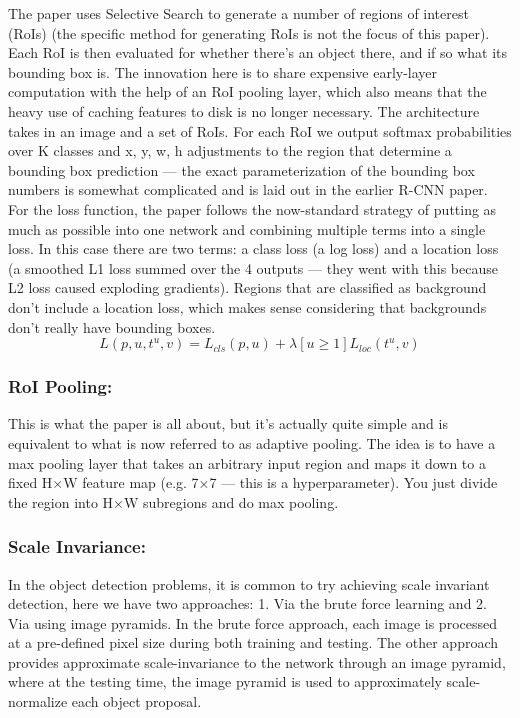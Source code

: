 \documentclass[10pt]{article}
\begin{document}
The paper uses Selective Search to generate a number of regions of interest (RoIs) (the specific method for generating RoIs is not the focus of this paper). Each RoI is then evaluated for whether there’s an object there, and if so what its bounding box is. The innovation here is to share expensive early-layer computation with the help of an RoI pooling layer, which also means that the heavy use of caching features to disk is no longer necessary.
The architecture takes in an image and a set of RoIs. For each RoI we output softmax probabilities over K classes and x, y, w, h adjustments to the region that determine a bounding box prediction — the exact parameterization of the bounding box numbers is somewhat complicated and is laid out in the earlier R-CNN paper. For the loss function, the paper follows the now-standard strategy of putting as much as possible into one network and combining multiple terms into a single loss. In this case there are two terms: a class loss (a log loss) and a location loss (a smoothed L1 loss summed over the 4 outputs — they went with this because L2 loss caused exploding gradients).
Regions that are classified as background don’t include a location loss, which makes sense considering that backgrounds don’t really have bounding boxes.
\[
	L(p, u, t^u, v)=L_{cls}(p, u)+\lambda[u \geq 1]L_{loc}(t^u, v)
\]

\subsubsection{RoI Pooling:}
This is what the paper is all about, but it’s actually quite simple and is equivalent to what is now referred to as adaptive pooling. The idea is to have a max pooling layer that takes an arbitrary input region and maps it down to a fixed H×W feature map (e.g. 7×7 — this is a hyperparameter). You just divide the region into H×W subregions and do max pooling.

\subsubsection{Scale Invariance:}
In the object detection problems, it is common to try achieving scale invariant detection, here we have two approaches: 1. Via the brute force learning and 2. Via using image pyramids. 
In the brute force approach, each image is processed at a pre-defined pixel size during both training and testing. The other approach provides approximate scale-invariance to the network through an image pyramid, where at the testing time, the image pyramid is used to approximately scale-normalize each object proposal.
\end{document}
